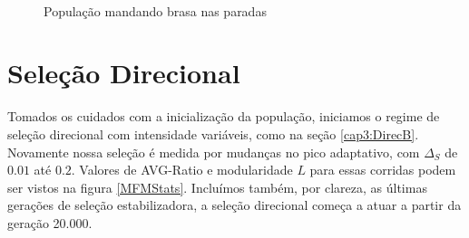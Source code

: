 \begin{figure}[htbp]
   \\
   \caption{População mandando brasa nas paradas}
   \label{varBurnin}
\end{figure}


\section{Seleção Direcional}

Tomados os cuidados com a inicialização da população, iniciamos o
regime de seleção direcional com intensidade variáveis, como na seção
\ref{cap3:DirecB}. 
Novamente nossa seleção é medida por mudanças no pico adaptativo, com
$\Delta_S$ de $0.01$ até $0.2$. 
Valores de AVG-Ratio e modularidade $L$ para essas corridas podem ser
vistos na figura \ref{MFMStats}. 
Incluímos também, por clareza, as últimas gerações de seleção
estabilizadora, a seleção direcional começa a atuar a partir da geração
20.000. 

